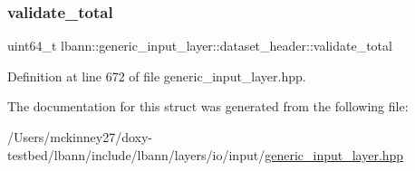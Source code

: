 \subsubsection{\texorpdfstring{validate\+\_\+total}{validate\_total}}
{\footnotesize\ttfamily uint64\+\_\+t lbann\+::generic\+\_\+input\+\_\+layer\+::dataset\+\_\+header\+::validate\+\_\+total}



Definition at line 672 of file generic\+\_\+input\+\_\+layer.\+hpp.



The documentation for this struct was generated from the following file\+:\begin{DoxyCompactItemize}
\item 
/\+Users/mckinney27/doxy-\/testbed/lbann/include/lbann/layers/io/input/\hyperlink{generic__input__layer_8hpp}{generic\+\_\+input\+\_\+layer.\+hpp}\end{DoxyCompactItemize}

